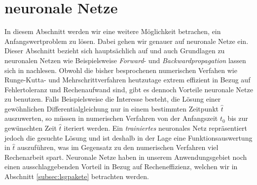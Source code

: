 \section{neuronale Netze}
In diesem Abschnitt werden wir eine weitere Möglichkeit betrachen, ein Anfangswertproblem zu lösen.
Dabei gehen wir genauer auf neuronale Netze ein. Dieser Abschnitt bezieht sich hauptsächlich auf
\cite{ovidiucalinDeepLearningArchitectures} und auch Grundlagen zu neuronalen Netzen wie Beispielsweise
\textit{Forward}- und \textit{Backwardpropagation} lassen sich in \cite[Chapter 6]{ovidiucalinDeepLearningArchitectures}
nachlesen. Obwohl die bisher besprochenen numerischen Verfahen wie Runge-Kutta- und Mehrschrittverfahren heutzutage
extrem effizient in Bezug auf Fehlertoleranz und Rechenaufwand sind, gibt es dennoch Vorteile neuronale Netze zu
benutzen. Falls Beispielsweise die Interesse besteht, die Lösung einer gewöhnlichen Differentialgleichung nur in einem
bestimmten Zeitpunkt $\hat{t}$ auszuwerten, so müssen in numerischen Verfahren von der Anfangszeit $t_0$ bis zur
gewünschten Zeit $\hat{t}$ iteriert werden. Ein \textit{trainiertes} neuronales Netz repräsentiert jedoch die gesuchte
Lösung und ist deshalb in der Lage eine Funktionsauswertung in $\hat{t}$ auszuführen, was im Gegensatz zu den
numerischen Verfahren viel Rechenarbeit spart. Neuronale Netze haben in unserem Anwendungsgebiet noch einen
ausschlaggebenden Vorteil in Bezug auf Recheneffizienz, welchen wir in Abschnitt \ref{subsec:lsgpakete} betrachten
werden.

